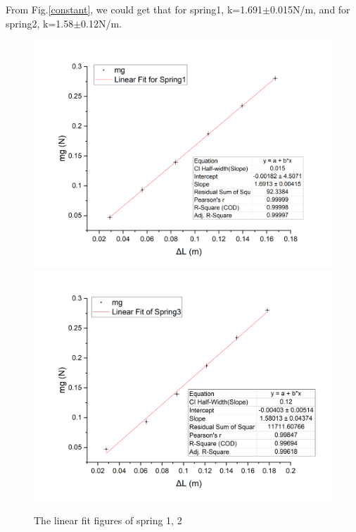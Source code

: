 \documentclass[12pt,a4paper]{article}
\begin{document}
From Fig.\ref{constant}, we could get that for spring1, k=1.691$\pm$0.015N/m, and for spring2, k=1.58$\pm$0.12N/m.

\begin{center}
    \begin{figure}[H]
    \includegraphics[scale=0.32]{k1.png}
    \includegraphics[scale=0.32]{k2.png}
    \caption{The linear fit figures of spring 1, 2}
    \end{figure}
    \label{constant}
\end{center}
\end{document}
